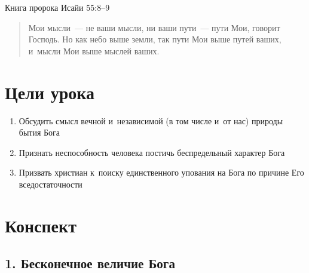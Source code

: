 \documentclass[a4paper,12pt]{article}
\begin{document}
Книга пророка Исайи 55:8--9
\begin{quote}
Мои мысли~--- не ваши мысли, ни ваши пути~--- пути Мои, говорит Господь.
Но как небо выше земли, так пути Мои выше путей ваших, и~мысли Мои выше мыслей ваших.
\end{quote}

\section{Цели урока}
\begin{enumerate}
    \item Обсудить смысл вечной и~независимой (в том числе и~от нас) природы бытия Бога
    \item Признать неспособность человека постичь беспредельный характер Бога
    \item Призвать христиан к~поиску единственного упования на Бога по причине Его вседостаточности
\end{enumerate}

\section{Конспект}

\subsection{1. Бесконечное величие Бога}
\end{document}
